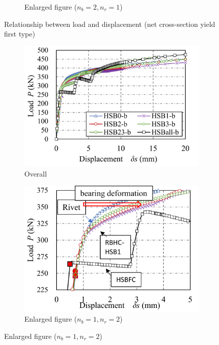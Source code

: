 \begin{figure}[htbp]
\begin{subfigure}[t]{0.48\textwidth}
    \caption{Enlarged figure ($n_b=2, n_r=1$)}
    \label{ch4fig11-c}
    \end{subfigure}
    \caption{Relationship between load and displacement (net cross-section yield first type)}
    \label{ch4fig11}
\end{figure}

\begin{figure}[htbp]
    \centering
    \begin{subfigure}[t]{0.76\textwidth}
    \includegraphics[width=\linewidth]{imgs/ch4/fig12-a.pdf}
    \caption{Overall}
    \label{ch4fig12-a}
    \end{subfigure}
    \begin{subfigure}[t]{0.48\textwidth}
    \includegraphics[width=\linewidth]{imgs/ch4/fig12-b.pdf}
    \caption{Enlarged figure ($n_b=1, n_r=2$)}

\end{subfigure}
\end{figure}
